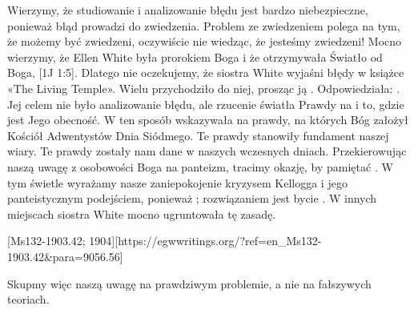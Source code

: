 Wierzymy, że studiowanie i analizowanie błędu jest bardzo niebezpieczne, ponieważ błąd prowadzi do zwiedzenia. Problem ze zwiedzeniem polega na tym, że możemy być zwiedzeni, oczywiście nie wiedząc, że jesteśmy zwiedzeni! Mocno wierzymy, że Ellen White była prorokiem Boga i że otrzymywała Światło od Boga, [1J 1:5]. Dlatego nie oczekujemy, że siostra White wyjaśni błędy w książce «The Living Temple». Wielu przychodziło do niej, prosząc ją . Odpowiedziała: . Jej celem nie było analizowanie błędu, ale rzucenie światła Prawdy na  i to, gdzie jest Jego obecność. W ten sposób wskazywała na prawdy, na których Bóg założył Kościół Adwentystów Dnia Siódmego. Te prawdy stanowiły fundament naszej wiary. Te prawdy zostały nam dane w naszych wczesnych dniach. Przekierowując naszą uwagę z osobowości Boga na panteizm, tracimy okazję, by pamiętać . W tym świetle wyrażamy nasze zaniepokojenie kryzysem Kellogga i jego panteistycznym podejściem, ponieważ ; rozwiązaniem jest bycie . W innych miejscach siostra White mocno ugruntowała tę zasadę.

[Ms132-1903.42; 1904][https://egwwritings.org/?ref=en\_Ms132-1903.42&para=9056.56]

Skupmy więc naszą uwagę na prawdziwym problemie, a nie na fałszywych teoriach.


